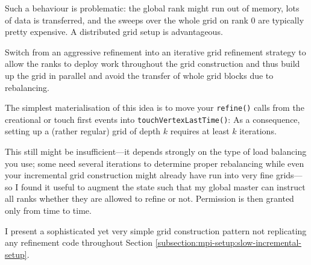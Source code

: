 Such a behaviour is problematic: the global rank might run out of memory, lots
of data is transferred, and the sweeps over the whole grid on rank 0 are
typically pretty expensive. 
A distributed grid setup is advantageous.

\begin{solution}
Switch from an aggressive
refinement into an iterative grid refinement strategy to allow the ranks to
deploy work throughout the grid construction and thus build up the grid in parallel and avoid the transfer of whole grid
blocks due to rebalancing.
\end{solution}

\noindent
The simplest materialisation of this idea is to 
move your \texttt{refine()} calls from the creational or touch first
events into \texttt{touchVertexLastTime()}:
As a consequence, setting up a (rather regular) grid of depth $k$ requires at
least $k$ iterations.

This still might be insufficient---it depends strongly on the type of load
balancing you use; some need several iterations to determine proper rebalancing
while even your incremental grid construction might already have run into very
fine grids---so I found it useful to augment the state such that my global
master can instruct all ranks whether they are allowed to refine or not. 
Permission is then granted only from time to time.


\begin{remark}
 I present a sophisticated yet very simple grid construction pattern not
 replicating any refinement code throughout Section
 \ref{subsection:mpi-setup:slow-incremental-setup}.
\end{remark}

% 



